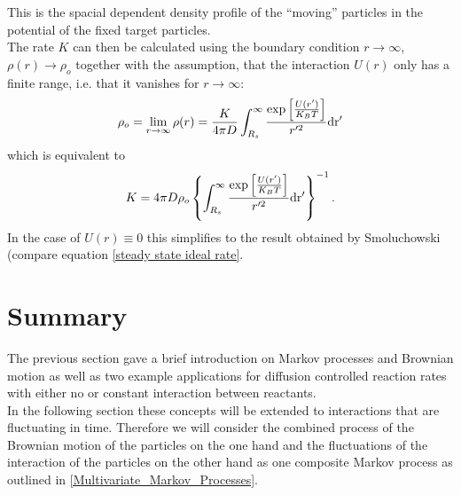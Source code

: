 This is the spacial dependent density profile of the ``moving'' particles in the potential of the fixed target particles. \\
The rate $K$ can then be calculated using the boundary condition $r \rightarrow \infty$, $\rho(r) \rightarrow \rho_o$ together with the assumption, that the interaction $U(r)$ only has a finite range, i.e. that it vanishes for $r \rightarrow \infty$:
\begin{equation}
    \rho_o = \lim_{r\rightarrow \infty} \rho(r) = \frac{K}{4 \pi D}\int_{R_s}^{\infty} \frac{\exp \left[ \frac{U(r')}{K_B T}\right]}{r'^2} \rm d r'
    \label{lim_rho_debye_infty}
\end{equation}
which is equivalent to 
\begin{equation}
    K = 4 \pi D \rho_o \left\{\int_{R_s}^{\infty} \frac{\exp \left[ \frac{U(r')}{K_B T}\right]}{r'^2} \rm d r' \right\}^{-1}.
    \label{K_Debye}
\end{equation}
In the case of $U(r) \equiv 0$ this simplifies to the result obtained by Smoluchowski (compare equation \eqref{steady state ideal rate}. \par
\section{Summary}
The previous section gave a brief introduction on Markov processes and Brownian motion as well as two example applications for diffusion controlled reaction rates with either no or constant interaction between reactants. \\
In the following section these concepts will be extended to interactions that are fluctuating in time. Therefore we will consider the combined process of the Brownian motion of the particles on the one hand and the fluctuations of the interaction of the particles on the other hand as one composite Markov process as outlined in \ref{Multivariate_Markov_Processes}.

\newpage
